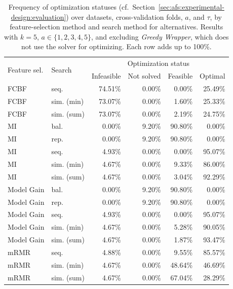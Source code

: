 \documentclass{article}
\theoremstyle{definition}
\begin{document}
\begin{table}[t]
	\centering
	\caption{
		Frequency of optimization statuses (cf.~Section~\ref{sec:afs:experimental-design:evaluation}) over datasets, cross-validation folds, $a$, and $\tau$, by feature-selection method and search method for alternatives.
		Results with $k=5$, $a \in \{1,2,3,4,5\}$, and excluding \emph{Greedy Wrapper}, which does not use the solver for optimizing.
		Each row adds up to 100\%.
	}
	\begin{tabular}{llrrrr}
		\toprule
		\multirow{2}{*}{Feature sel.} & \multirow{2}{*}{Search} & \multicolumn{4}{c}{Optimization status} \\
		\cmidrule(lr){3-6}
		& & Infeasible & Not solved & Feasible & Optimal \\
		\midrule
		FCBF & seq. & 74.51\% & 0.00\% & 0.00\% & 25.49\% \\
		FCBF & sim. (min) & 73.07\% & 0.00\% & 1.60\% & 25.33\% \\
		FCBF & sim. (sum) & 73.07\% & 0.00\% & 2.19\% & 24.75\% \\
		MI & bal. & 0.00\% & 9.20\% & 90.80\% & 0.00\% \\
		MI & rep. & 0.00\% & 9.20\% & 90.80\% & 0.00\% \\
		MI & seq. & 4.93\% & 0.00\% & 0.00\% & 95.07\% \\
		MI & sim. (min) & 4.67\% & 0.00\% & 9.33\% & 86.00\% \\
		MI & sim. (sum) & 4.67\% & 0.00\% & 3.04\% & 92.29\% \\
		Model Gain & bal. & 0.00\% & 9.20\% & 90.80\% & 0.00\% \\
		Model Gain & rep. & 0.00\% & 9.20\% & 90.80\% & 0.00\% \\
		Model Gain & seq. & 4.93\% & 0.00\% & 0.00\% & 95.07\% \\
		Model Gain & sim. (min) & 4.67\% & 0.00\% & 5.28\% & 90.05\% \\
		Model Gain & sim. (sum) & 4.67\% & 0.00\% & 1.87\% & 93.47\% \\
		mRMR & seq. & 4.88\% & 0.00\% & 9.55\% & 85.57\% \\
		mRMR & sim. (min) & 4.67\% & 0.00\% & 48.64\% & 46.69\% \\
		mRMR & sim. (sum) & 4.67\% & 0.00\% & 67.04\% & 28.29\% \\
		\bottomrule
	\end{tabular}
	\label{tab:afs:impact-search-fs-method-optimization-status}
\end{table}
\end{document}
